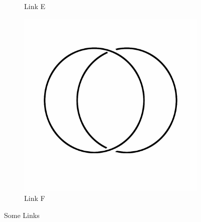 \documentclass[12pt,letterpaper]{article}
\theoremstyle{definition}
\begin{document}
\begin{figure}[h]
\begin{subfigure}{.3\textwidth}
        \caption{Link E}
    \end{subfigure}
    \quad
    \begin{subfigure}{.3\textwidth}
        \centering
        \includegraphics[width=\textwidth]{knotpics/unlink.png}
        \caption{Link F}
    \end{subfigure}
    \caption{Some Links}
\end{figure}
\end{document}
